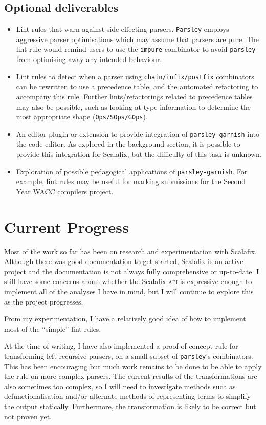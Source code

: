 \subsection{Optional deliverables}
\begin{itemize}
  \item
  Lint rules that warn against side-effecting parsers.
  \texttt{Parsley} employs aggressive parser optimisations which may assume that parsers are pure.
  The lint rule would remind users to use the \texttt{impure} combinator to avoid \texttt{parsley} from optimising away any intended behaviour.
  \item
  Lint rules to detect when a parser using \texttt{chain/infix/postfix} combinators can be rewritten to use a precedence table, and the automated refactoring to accompany this rule.
  Further lints/refactorings related to precedence tables may also be possible, such as looking at type information to determine the most appropriate shape (\texttt{Ops/SOps/GOps}).
  \item
  An editor plugin or extension to provide integration of \texttt{parsley-garnish} into the code editor.
  As explored in the background section, it is possible to provide this integration for Scalafix, but the difficulty of this task is unknown.
  \item
  Exploration of possible pedagogical applications of \texttt{parsley-garnish}.
  For example, lint rules may be useful for marking submissions for the Second Year WACC compilers project.
\end{itemize}

\section{Current Progress}
Most of the work so far has been on research and experimentation with Scalafix.
Although there was good documentation to get started, Scalafix is an active project and the documentation is not always fully comprehensive or up-to-date.
I still have some concerns about whether the Scalafix \textsc{api} is expressive enough to implement all of the analyses I have in mind, but I will continue to explore this as the project progresses.

From my experimentation, I have a relatively good idea of how to implement most of the ``simple'' lint rules.

At the time of writing, I have also implemented a proof-of-concept rule for transforming left-recursive parsers, on a small subset of \texttt{parsley}'s combinators.
This has been encouraging but much work remains to be done to be able to apply the rule on more complex parsers.
The current results of the transformations are also sometimes too complex, so I will need to investigate methods such as defunctionalisation and/or alternate methods of representing terms to simplify the output statically.
Furthermore, the transformation is likely to be correct but not proven yet.

